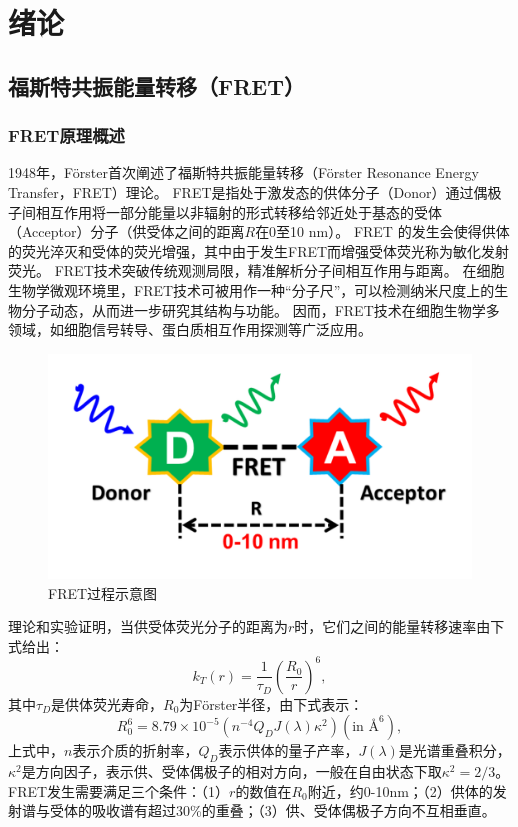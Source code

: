 \chapter{绪论}

\section{福斯特共振能量转移（FRET）}

\subsection{FRET原理概述}
1948年，Förster首次阐述了福斯特共振能量转移（Förster Resonance Energy Transfer，FRET）理论。
FRET是指处于激发态的供体分子（Donor）通过偶极子间相互作用将一部分能量以非辐射的形式转移给邻近处于基态的受体（Acceptor）分子（供受体之间的距离$R$在0至10 nm）。
FRET 的发生会使得供体的荧光淬灭和受体的荧光增强，其中由于发生FRET而增强受体荧光称为敏化发射荧光。
FRET技术突破传统观测局限，精准解析分子间相互作用与距离。
在细胞生物学微观环境里，FRET技术可被用作一种“分子尺”，可以检测纳米尺度上的生物分子动态，从而进一步研究其结构与功能。
因而，FRET技术在细胞生物学多领域，如细胞信号转导、蛋白质相互作用探测等广泛应用。
\begin{figure}[htbp]
    \centering
    \includegraphics[width=0.5\linewidth]{../figures/1/1_FRET过程示意图.png}
    \caption{FRET过程示意图}
    \label{fig:fret}
\end{figure}

理论和实验证明，当供受体荧光分子的距离为$r$时，它们之间的能量转移速率由下式给出：
\begin{equation}
    k_T(r)=\frac{1}{\tau_D}(\frac{R_0}{r})^6, \label{eq:1-1}
\end{equation}
其中$\tau_D$是供体荧光寿命，$R_0$为Förster半径，由下式表示：
\begin{equation}
    R_0^6=8.79\times{10^{-5}}(n^{-4}Q_DJ(\lambda)\kappa^2)(\text{in~} \mbox{\AA}^6),
\end{equation}
上式中，$n$表示介质的折射率，$Q_D$表示供体的量子产率，$J(\lambda)$是光谱重叠积分，$\kappa^2$是方向因子，表示供、受体偶极子的相对方向，一般在自由状态下取$\kappa^2=2/3$。FRET发生需要满足三个条件：（1）$r$的数值在$R_0$附近，约0-10nm；（2）供体的发射谱与受体的吸收谱有超过30\%的重叠；（3）供、受体偶极子方向不互相垂直。

